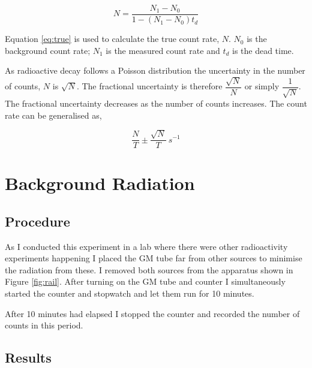 \documentclass[twocolumn]{revtex4-1}
\begin{document}
\vspace{-3ex}

\begin{equation}
N=\dfrac{N_{1}-N_{0}}{1-\left(N_{1}-N_{0}\right)t_{d}}
\label{eq:true}
\end{equation}

Equation \ref{eq:true} is used to calculate the true count rate, $N$. $N_{0}$ is the background count rate; $N_{1}$ is the measured count rate and $t_{d}$ is the dead time.\cite{dead}

As radioactive decay follows a Poisson distribution the uncertainty in the number of counts, $N$ is $\sqrt{N}$.\cite{poisson} The fractional uncertainty is therefore $\dfrac{\sqrt{N}}{N}$ or simply $\dfrac{1}{\sqrt{N}}$.
The fractional uncertainty decreases as the number of counts increases. The count rate can be generalised as,

\vspace{-3ex}

\begin{equation}
\dfrac{N}{T} \pm \dfrac{\sqrt{N}}{T}\ s^{-1}
\label{eq:unc}
\end{equation}

\vspace{-3ex}

\vspace{-3ex}
\section{Background Radiation} 

\vspace{-2ex}
\subsection{Procedure}
\vspace{-3ex}

As I conducted this experiment in a lab where there were other radioactivity experiments happening I placed the GM tube far from other sources to minimise the radiation from these.
I removed both sources from the apparatus shown in Figure \ref{fig:rail}.
After turning on the GM tube and counter I simultaneously started the counter and stopwatch and let them run for 10 minutes.

After 10 minutes had elapsed I stopped the counter and recorded the number of counts in this period.

\vspace{-2ex}
\subsection{Results} 
\vspace{-3ex}
\end{document}
